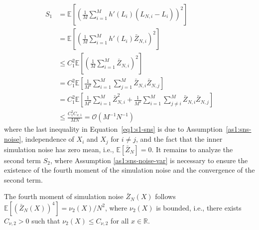 \begin{align} \label{eq1:s1-sns}
    S_1 
    & = \mathbb{E} \left[ \left(\frac{1}{M} \sum_{i=1}^M h'\left( L_i \right) \left( \hat{L}_{N, i} - L_i \right) \right)^2 \right] \nonumber \\
    & = \mathbb{E} \left[ \left(\frac{1}{M} \sum_{i=1}^M h'\left( L_i \right) \bar{Z}_{N, i} \right)^2 \right] \nonumber \\
    & \leq C_1^2 \mathbb{E} \left[ \left(\frac{1}{M} \sum_{i=1}^M \bar{Z}_{N, i} \right)^2 \right] \nonumber \\
    & = C_1^2 \mathbb{E} \left[ \frac{1}{M^2} \sum_{i=1}^M \sum_{j=1}^M \bar{Z}_{N, i} \bar{Z}_{N, j} \right] \nonumber \\
    & = C_1^2 \mathbb{E} \left[ \frac{1}{M^2} \sum_{i=1}^M \bar{Z}_{N, i}^2 + \frac{1}{M^2} \sum_{i=1}^M \sum_{j \neq i}^M \bar{Z}_{N, i} \bar{Z}_{N, j} \right] \nonumber \\
    & \leq  \frac{C_1^2 C_{\nu, 1}}{MN} = \mathcal{O}(M^{-1} N^{-1})
\end{align}
where the last inequality in Equation~\ref{eq1:s1-sns} is due to Assumption~\ref{as1:sns-noise}, independence of $X_i$ and $X_j$ for $i \neq j$, and the fact that the inner simulation noise has zero mean, i.e., $\mathbb{E} \left[ \bar{Z}_N \right] = 0$. 
It remains to analyze the second term $S_2$, where Assumption \ref{as1:sns-noise-var} is necessary to ensure the existence of the fourth moment of the simulation noise and the convergence of the second term.

\begin{assumption} \label{as1:sns-noise-var}
    The fourth moment of simulation noise $\bar{Z}_N(X)$ follows $\mathbb{E} \left[ \left( \bar{Z}_N(X) \right)^4 \right] = \nu_2(X) / N^2$, where $\nu_2(X)$ is bounded, i.e., there exists $C_{\nu,2} > 0$ such that $\nu_2(X) \leq C_{\nu,2}$ for all $x \in \mathbb{R}$.
\end{assumption}

